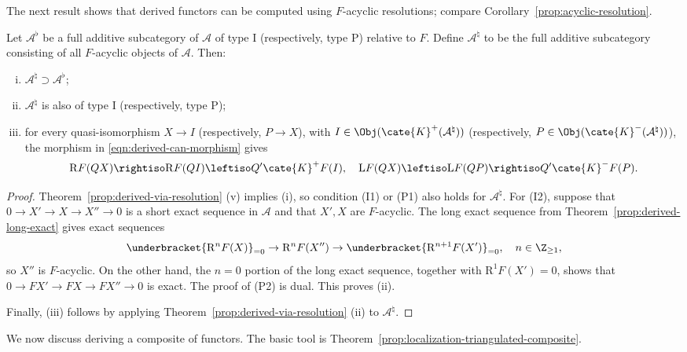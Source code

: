 The next result shows that derived functors can be computed using
$F$-acyclic resolutions; compare Corollary~\ref{prop:acyclic-resolution}.

\begin{corollary}\label{prop:derived-via-F-acyclic}
	Let $\mathcal{A}^\flat$ be a full additive subcategory of $\mathcal{A}$ of
	type I (respectively, type P) relative to $F$. Define
	$\mathcal{A}^\natural$ to be the full additive subcategory consisting of all
	$F$-acyclic objects of $\mathcal{A}$. Then:
	\begin{enumerate}[(i)]
		\item $\mathcal{A}^\natural\supset\mathcal{A}^\flat$;
		\item $\mathcal{A}^\natural$ is also of type I (respectively, type P);
		\item for every quasi-isomorphism $X\to I$ (respectively, $P\to X$),
		with $I\in\Obj(\cate{K}^+(\mathcal{A}^\natural))$ (respectively,
		$P\in\Obj(\cate{K}^-(\mathcal{A}^\natural))$), the morphism in
		\eqref{eqn:derived-can-morphism} gives
		\[ \mathrm{R}F(QX) \rightiso \mathrm{R}F(QI) \leftiso Q' \cate{K}^+ F(I), \quad \mathrm{L}F(QX) \leftiso \mathrm{L}F(QP) \rightiso Q' \cate{K}^- F(P). \]
	\end{enumerate}
\end{corollary}
\begin{proof}
	Theorem~\ref{prop:derived-via-resolution} (v) implies (i), so condition (I1)
	or (P1) also holds for $\mathcal{A}^\natural$. For (I2), suppose that
	$0\to X'\to X\to X''\to0$ is a short exact sequence in $\mathcal{A}$ and
	that $X',X$ are $F$-acyclic. The long exact sequence from
	Theorem~\ref{prop:derived-long-exact} gives exact sequences
	\[ \underbracket{\mathrm{R}^n F(X)}_{= 0} \to \mathrm{R}^n F(X'') \to \underbracket{\mathrm{R}^{n+1}F(X')}_{= 0}, \quad n \in \Z_{\geq 1} , \]
	so $X''$ is $F$-acyclic. On the other hand, the $n=0$ portion of the long
	exact sequence, together with $\mathrm{R}^1F(X')=0$, shows that
	$0\to FX'\to FX\to FX''\to0$ is exact. The proof of (P2) is dual. This
	proves (ii).

	Finally, (iii) follows by applying
	Theorem~\ref{prop:derived-via-resolution} (ii) to
	$\mathcal{A}^\natural$.
\end{proof}

We now discuss deriving a composite of functors. The basic tool is
Theorem~\ref{prop:localization-triangulated-composite}.

